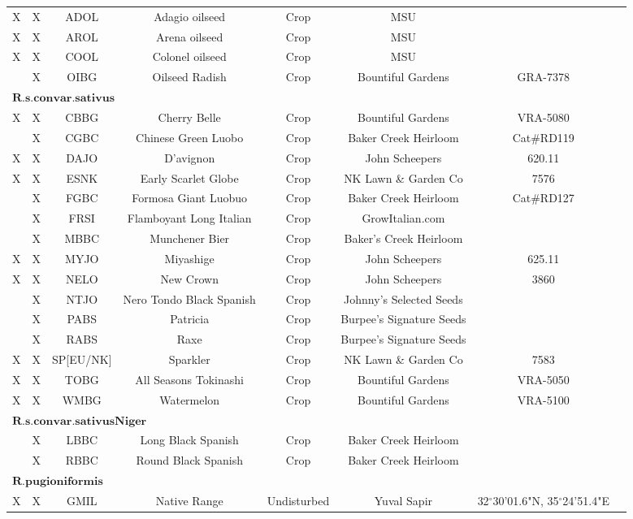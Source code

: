 \documentclass[twocolumn]{bmcart}%
\begin{document}
\begin{backmatter}
\begin{table}[p]
\begin{tabular}{cccccccc}
X & X & ADOL & Adagio oilseed & Crop & MSU & \\
X & X & AROL & Arena oilseed & Crop & MSU & \\
X & X & COOL & Colonel oilseed & Crop & MSU & \\
 & X & OIBG & Oilseed Radish & Crop & Bountiful Gardens & GRA-7378 \\ \hline
\multicolumn{5}{l}{$\boldsymbol{R. s. convar. sativus}$} \\
X & X & CBBG & Cherry Belle & Crop & Bountiful Gardens & VRA-5080\\
 & X & CGBC & Chinese Green Luobo & Crop & Baker Creek Heirloom & Cat\#RD119\\
X & X & DAJO & D'avignon & Crop & John Scheepers & 620.11\\
X & X & ESNK & Early Scarlet Globe & Crop & NK Lawn \& Garden Co & 7576\\
 & X & FGBC & Formosa Giant Luobuo & Crop & Baker Creek Heirloom & Cat\#RD127\\
 & X & FRSI & Flamboyant Long Italian  & Crop & GrowItalian.com & \\
 & X & MBBC & Munchener Bier & Crop & Baker's Creek Heirloom & \\
X & X & MYJO & Miyashige & Crop & John Scheepers & 625.11\\
X & X & NELO & New Crown & Crop & John Scheepers & 3860\\
 & X & NTJO & Nero Tondo Black Spanish & Crop & Johnny’s Selected Seeds & \\
 & X & PABS & Patricia & Crop & Burpee's Signature Seeds & \\
 & X & RABS & Raxe & Crop & Burpee's Signature Seeds & \\
X & X & SP[EU/NK] & Sparkler & Crop &	 NK Lawn \& Garden Co & 7583\\
X & X & TOBG & All Seasons Tokinashi & Crop & Bountiful Gardens & VRA-5050\\
X & X & WMBG & Watermelon & Crop & Bountiful Gardens & VRA-5100\\ \hline
\multicolumn{5}{l}{$\boldsymbol{R. s. convar. sativus Niger}$} \\
 & X & LBBC & Long Black Spanish & Crop & Baker Creek Heirloom & \\
 & X & RBBC & Round Black Spanish & Crop & Baker Creek Heirloom & \\ \hline
\multicolumn{5}{l}{$\boldsymbol{R. pugioniformis}$} \\
X & X & GMIL & Native Range & Undisturbed & Yuval Sapir & 32{\ensuremath{^\circ}}30'01.6"N, 35{\ensuremath{^\circ}}24'51.4"E\\ \hline
 \end{tabular}
\end{table}



\end{backmatter}
\end{document}
